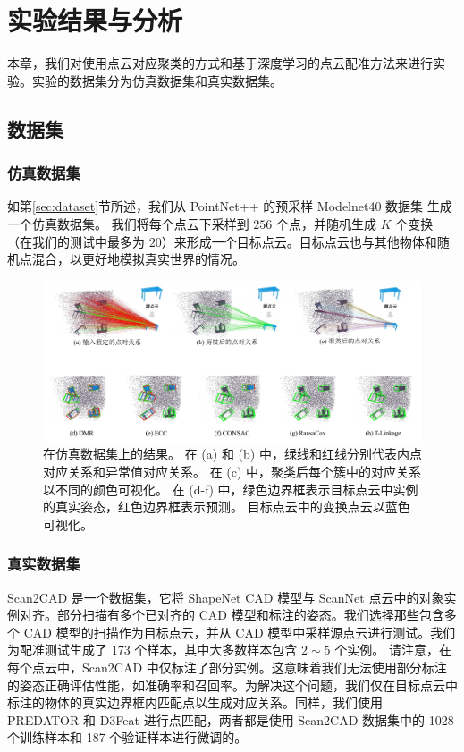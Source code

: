 \chapter{实验结果与分析}
本章，我们对使用点云对应聚类的方式和基于深度学习的点云配准方法来进行实验。实验的数据集分为仿真数据集和真实数据集。
\section{数据集}
\subsection{仿真数据集}
如第\ref{sec:dataset}节所述，我们从 PointNet++ \cite{qi2017pointnet++} 的预采样 Modelnet40 数据集\cite{sunmodelnet40} 生成一个仿真数据集。
我们将每个点云下采样到 $256$ 个点，并随机生成 $K$ 个变换（在我们的测试中最多为 $20$）来形成一个目标点云。目标点云也与其他物体和随机点混合，以更好地模拟真实世界的情况。

\begin{figure}
        \centering
        \includegraphics[width=1.0\textwidth]{images/DMR_syn.pdf}
        \caption{
                在仿真数据集上的结果。
                在 (a) 和 (b) 中，绿线和红线分别代表内点对应关系和异常值对应关系。
                在 (c) 中，聚类后每个簇中的对应关系以不同的颜色可视化。
                在 (d-f) 中，绿色边界框表示目标点云中实例的真实姿态，红色边界框表示预测。
                目标点云中的变换点云以蓝色可视化。
        }
        \label{fig:DMR}
\end{figure}

\subsection{真实数据集}
Scan2CAD\cite{avetisyan2019scan2cad} 是一个数据集，它将 ShapeNet\cite{chang2015shapenet} CAD 模型与 ScanNet\cite{dai2017scannet} 点云中的对象实例对齐。部分扫描有多个已对齐的 CAD 模型和标注的姿态。我们选择那些包含多个 CAD 模型的扫描作为目标点云，并从 CAD 模型中采样源点云进行测试。我们为配准测试生成了 173 个样本，其中大多数样本包含 $2 \sim 5$ 个实例。
请注意，在每个点云中，Scan2CAD 中仅标注了部分实例。这意味着我们无法使用部分标注的姿态正确评估性能，如准确率和召回率。为解决这个问题，我们仅在目标点云中标注的物体的真实边界框内匹配点以生成对应关系。同样，我们使用 PREDATOR\cite{huang2021predator} 和 D3Feat\cite{bai2020d3feat} 进行点匹配，两者都是使用 Scan2CAD 数据集中的 1028 个训练样本和 187 个验证样本进行微调的。

